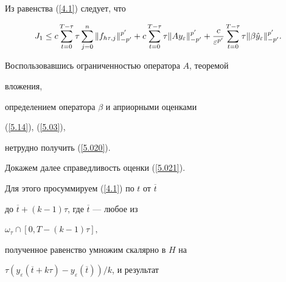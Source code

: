 \begin{pf}  Из равенства (\ref{4.1}) следует, что


$$


J_1 \le


c\sum^{T-\tau }_{t=0}\tau


\sum^{n}_{j=0} \| f_{h\tau,j} \|^{p'}_{-p'}+


c\sum^{T-\tau }_{t=0}\tau \|


Ay_\varepsilon \|^{p'}_{-p'}+


\frac{c}{\varepsilon^{p'}}\sum^{T-\tau }_{t=0}\tau \|


\beta\Hat{y}_\varepsilon \|^{p'}_{-p'}.


$$


Воспользовавшись ограниченностью оператора $A $, теоремой


вложения,


определением оператора $\beta$ и априорными оценками


(\ref{5.14}), (\ref{5.03}),
























нетрудно получить (\ref{5.020}).





Докажем далее справедливость  оценки (\ref{5.021}).


Для этого просуммируем (\ref{4.1}) по $t$ от $\overline{t}$


до $\overline{t} + ( k - 1 )\tau $, где $\overline{t}$ --- любое из


$\omega_\tau \cap [ 0, T - ( k - 1 )\tau ],$


полученное равенство умножим скалярно в $H$ на


$\tau ( y_\varepsilon ( \overline{t}


+ k \tau ) - y_\varepsilon( \overline{t} ) ) / k $, и результат



\end{pf}
